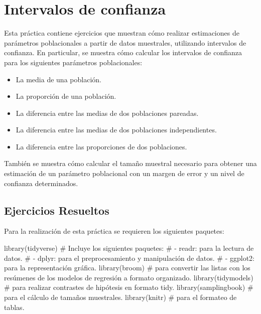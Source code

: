 \documentclass[
  a4paper,
]{scrreport}
\newenvironment{Shaded}{\begin{snugshade}}{\end{snugshade}}
\newcommand{\CommentTok}[1]{\textcolor[rgb]{0.37,0.37,0.37}{#1}}
\newcommand{\FunctionTok}[1]{\textcolor[rgb]{0.28,0.35,0.67}{#1}}
\newcommand{\NormalTok}[1]{\textcolor[rgb]{0.00,0.23,0.31}{#1}}
\providecommand{\tightlist}{%
  \setlength{\itemsep}{0pt}\setlength{\parskip}{0pt}}\usepackage{longtable,booktabs,array}
\theoremstyle{definition}
\theoremstyle{remark}
\begin{document}

\chapter{Intervalos de confianza}\label{intervalos-de-confianza}

Esta práctica contiene ejercicios que muestran cómo realizar
estimaciones de parámetros poblacionales a partir de datos muestrales,
utilizando intervalos de confianza. En particular, se muestra cómo
calcular los intervalos de confianza para los siguientes parámetros
poblacionales:

\begin{itemize}
\tightlist
\item
  La media de una población.
\item
  La proporción de una población.
\item
  La diferencia entre las medias de dos poblaciones pareadas.
\item
  La diferencia entre las medias de dos poblaciones independientes.
\item
  La diferencia entre las proporciones de dos poblaciones.
\end{itemize}

También se muestra cómo calcular el tamaño muestral necesario para
obtener una estimación de un parámetro poblacional con un margen de
error y un nivel de confianza determinados.

\section{Ejercicios Resueltos}\label{ejercicios-resueltos-5}

Para la realización de esta práctica se requieren los siguientes
paquetes:

\begin{Shaded}
\begin{Highlighting}[]
\FunctionTok{library}\NormalTok{(tidyverse)}
\CommentTok{\# Incluye los siguientes paquetes:}
\CommentTok{\# {-} readr: para la lectura de datos.}
\CommentTok{\# {-} dplyr: para el preprocesamiento y manipulación de datos.}
\CommentTok{\# {-} ggplot2: para la representación gráfica.}
\FunctionTok{library}\NormalTok{(broom) }\CommentTok{\# para convertir las listas con los resúmenes de los modelos de regresión a formato organizado.}
\FunctionTok{library}\NormalTok{(tidymodels) }\CommentTok{\# para realizar contrastes de hipótesis en formato tidy.}
\FunctionTok{library}\NormalTok{(samplingbook) }\CommentTok{\# para el cálculo de tamaños muestrales.}
\FunctionTok{library}\NormalTok{(knitr) }\CommentTok{\# para el formateo de tablas.}
\end{Highlighting}
\end{Shaded}
\end{document}
